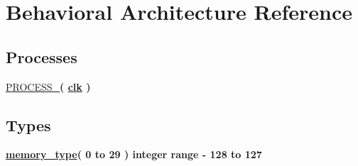 \hypertarget{classsinewave_1_1_behavioral}{}\section{Behavioral Architecture Reference}
\label{classsinewave_1_1_behavioral}
\subsection*{Processes}
 \begin{DoxyCompactItemize}
\item 
\hyperlink{classsinewave_1_1_behavioral_ab420c8ab236dc4c973f8a5ae6dccbd65}{P\+R\+O\+C\+E\+S\+S\+\_}{\bfseries  ( {\bfseries {\bfseries \hyperlink{classsinewave_a4a4609c199d30b3adebbeb3a01276ec5}{clk}} \textcolor{vhdlchar}{ }} )}
\end{DoxyCompactItemize}
\subsection*{Types}
 \begin{DoxyCompactItemize}
\item 
{\bfseries \hyperlink{classsinewave_1_1_behavioral_afe56ca9fb731309e3a6c15d4fd490e06}{memory\+\_\+type}{\bfseries \textcolor{vhdlchar}{(}\textcolor{vhdlchar}{ }\textcolor{vhdlchar}{ } \textcolor{vhdldigit}{0} \textcolor{vhdlchar}{ }\textcolor{keywordflow}{to}\textcolor{vhdlchar}{ }\textcolor{vhdlchar}{ } \textcolor{vhdldigit}{29} \textcolor{vhdlchar}{ }\textcolor{vhdlchar}{)}\textcolor{vhdlchar}{ }\textcolor{vhdlchar}{ }\textcolor{comment}{integer}\textcolor{vhdlchar}{ }\textcolor{vhdlchar}{ }\textcolor{vhdlchar}{ }\textcolor{keywordflow}{range}\textcolor{vhdlchar}{ }\textcolor{vhdlchar}{-\/}\textcolor{vhdlchar}{ } \textcolor{vhdldigit}{128} \textcolor{vhdlchar}{ }\textcolor{keywordflow}{to}\textcolor{vhdlchar}{ }\textcolor{vhdlchar}{ } \textcolor{vhdldigit}{127} \textcolor{vhdlchar}{ }}} 
\end{DoxyCompactItemize}
